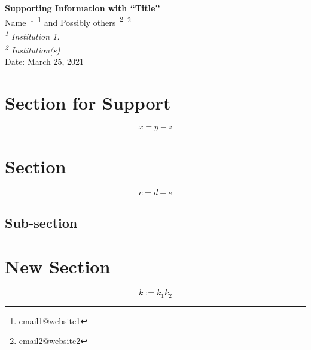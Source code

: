 \np
\begin{center}
{\bf Supporting Information with ``Title''} \bsk\\
    Name~\footnote{email1@website1}~\textsuperscript{1} 
    and Possibly others~\footnote{email2@website2}~\textsuperscript{2}\\
{\em \textsuperscript{1} Institution 1.}\\
{\em \textsuperscript{2} Institution(s)}\\
Date: March 25, 2021
    \label{support}
\end{center}

\setcounter{equation}{0}
\renewcommand{\theequation}{S\arabic{equation}}

\setcounter{section}{0}

\renewcommand{\thesection}{SI-\arabic{section}}
\renewcommand{\thefigure}{S\arabic{figure}}

\section{Section for Support}
\label{Supp}
%
\begin{equation}
    x = y - z
    \label{xyz}
\end{equation}
%

\renewcommand{\theequation}{\Alph{section}\arabic{equation}}

%
\renewcommand{\thesection}{Appendix~\Alph{section}}
\renewcommand{\thefigure}{\Alph{figure}}
%

\setcounter{section}{0}

\section{Section}

\begin{equation}
    c = d + e
    \label{Eqn2}
\end{equation}
%
\subsection{Sub-section}
\label{AppASub}

\section{New Section}

\begin{equation}
    k := k_1 k_2
    \label{EqnD}
\end{equation}


